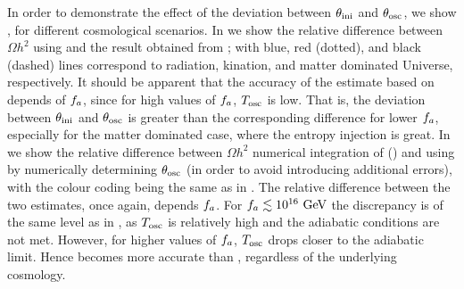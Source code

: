 \documentclass[11pt,a4paper]{article}
\begin{document}
In order to demonstrate the effect of the deviation between $\theta_{\rm ini}{}$ and $\theta_{\rm osc}{}$, we show , for different cosmological scenarios. In  we show the relative difference between $\Omega h^2$ using  and the result obtained from \mimes; with blue, red (dotted), and black (dashed) lines correspond to radiation, kination, and matter dominated Universe, respectively. It should be apparent that the accuracy of the estimate based on  depends of $f_{a}{}$, since for high values of $f_{a}{}$, $T_{\rm osc}{}$ is low. That is, the deviation between $\theta_{\rm ini}{}$ and $\theta_{\rm osc}{}$ is greater than the corresponding difference for lower $f_{a}{}$, especially for the matter dominated case, where the entropy injection is great.
%
In  we show the relative difference between $\Omega h^2$ numerical integration of  (\ie \mimes) and using  by numerically determining $\theta_{\rm osc}{}$ (in order to avoid introducing additional errors), with the colour coding being the same as in . The relative difference between the two estimates, once again, depends $f_{a}{}$. For $f_{a}{} \lesssim 10^{16}~{\rm GeV}$ the discrepancy is of the same level as in , as $T_{\rm osc}{}$ is relatively high and the adiabatic conditions are not met. However, for higher values of $f_{a}{}$, $T_{\rm osc}{}$ drops closer to the adiabatic limit. Hence  becomes more accurate than , regardless of the underlying cosmology.
%
\end{document}
